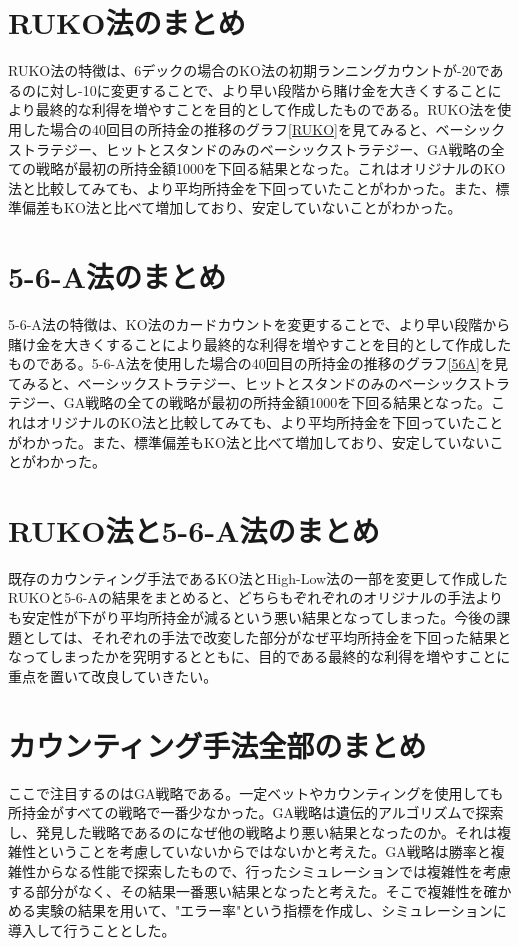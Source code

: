 \section{RUKO法のまとめ}
RUKO法の特徴は、6デックの場合のKO法の初期ランニングカウントが-20であるのに対し-10に変更することで、より早い段階から賭け金を大きくすることにより最終的な利得を増やすことを目的として作成したものである。RUKO法を使用した場合の40回目の所持金の推移のグラフ\ref{RUKO}を見てみると、ベーシックストラテジー、ヒットとスタンドのみのベーシックストラテジー、GA戦略の全ての戦略が最初の所持金額1000を下回る結果となった。これはオリジナルのKO法と比較してみても、より平均所持金を下回っていたことがわかった。また、標準偏差もKO法と比べて増加しており、安定していないことがわかった。
\section{5-6-A法のまとめ}
5-6-A法の特徴は、KO法のカードカウントを変更することで、より早い段階から賭け金を大きくすることにより最終的な利得を増やすことを目的として作成したものである。5-6-A法を使用した場合の40回目の所持金の推移のグラフ\ref{56A}を見てみると、ベーシックストラテジー、ヒットとスタンドのみのベーシックストラテジー、GA戦略の全ての戦略が最初の所持金額1000を下回る結果となった。これはオリジナルのKO法と比較してみても、より平均所持金を下回っていたことがわかった。また、標準偏差もKO法と比べて増加しており、安定していないことがわかった。
\section{RUKO法と5-6-A法のまとめ}
既存のカウンティング手法であるKO法とHigh-Low法の一部を変更して作成したRUKOと5-6-Aの結果をまとめると、どちらもぞれぞれのオリジナルの手法よりも安定性が下がり平均所持金が減るという悪い結果となってしまった。今後の課題としては、それぞれの手法で改変した部分がなぜ平均所持金を下回った結果となってしまったかを究明するとともに、目的である最終的な利得を増やすことに重点を置いて改良していきたい。
\section{カウンティング手法全部のまとめ}
ここで注目するのはGA戦略である。一定ベットやカウンティングを使用しても所持金がすべての戦略で一番少なかった。GA戦略は遺伝的アルゴリズムで探索し、発見した戦略であるのになぜ他の戦略より悪い結果となったのか。それは複雑性ということを考慮していないからではないかと考えた。GA戦略は勝率と複雑性からなる性能で探索したもので、行ったシミュレーションでは複雑性を考慮する部分がなく、その結果一番悪い結果となったと考えた。そこで複雑性を確かめる実験の結果を用いて、"エラー率"という指標を作成し、シミュレーションに導入して行うこととした。

